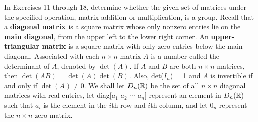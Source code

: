 \noindent In Exercises 11 through 18, determine whether the given set of
          matrices under the specified operation, matrix addition or 
          multiplication, is a group. Recall that a \textbf{diagonal matrix} is
          a square matrix whose only nonzero entries lie on the
          \textbf{main diagonal}, from the upper left to the lower right corner.
          An \textbf{upper-triangular matrix} is a square matrix with only zero
          entries below the main diagonal. Associated with each $n \times n$
          matrix $A$ is a number called the determinant of $A$, denoted by
          $\det(A)$. If $A$ and $B$ are both $n \times n$ matrices, then
          $\det(AB) = \det(A)\det(B)$. Also, det($I_n$) = 1 and $A$ is
          invertible if and only if $\det(A) \neq 0$. We shall let $D_n(\mathbb{R})$ be
			 the set of all $n \times n$ diagonal matrices with real entries, let
			 diag[$a_1$ $a_2$ $\cdots$ $a_n$] represent an element in $D_n(\mathbb{R})$
			 such that $a_i$ is the element in the $i$th row and $i$th column, and
			 let $0_n$ represent the $n \times n$ zero matrix.

